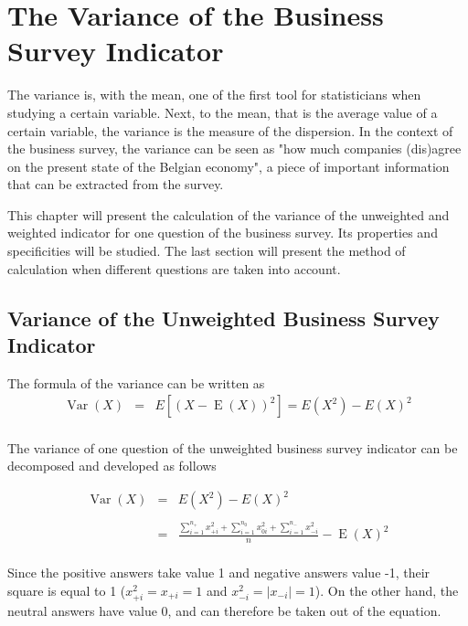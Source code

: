\documentclass[12pt,a4paper,oneside]{book}
\DeclareMathOperator{\Var}{Var}
\DeclareMathOperator{\E}{E}
\begin{document}
\chapter{The Variance of the Business Survey Indicator}

The variance is, with the mean, one of the first tool for statisticians when studying a certain variable. 
Next, to the mean, that is the average value of a certain variable, the variance is the measure of the dispersion. 
In the context of the business survey, the variance can be seen as "how much companies (dis)agree on the present state of the Belgian economy", a piece of important information that can be extracted from the survey.

This chapter will present the calculation of the variance of the unweighted and weighted indicator for one question of the business survey. 
Its properties and specificities will be studied.
The last section will present the method of calculation when different questions are taken into account.

\section{Variance of the Unweighted Business Survey Indicator}

\nocite{alcaniz_calculation_2006}

The formula of the variance can be written as 
\begin{eqnarray}
         \Var(X) &=& E \left[ \left(X-\E(X) \right)^2 \right] =  E\left( X^2\right) - E\left( X\right)^2 \\ \nonumber
\end{eqnarray}

The variance of one question of the unweighted business survey indicator can be decomposed and developed as follows

\begin{eqnarray}
\Var(X) &=&  E\left( X^2\right) - E\left( X\right)^2 \nonumber \\ \nonumber \\
    &=&  \frac{\sum_{i=1}^{n_+} x_{+i}^2  +  \sum_{i=1}^{n_0} x_{0i}^2 + \sum_{i=1}^{n_-} x_{-i}^2}{n}  - \E(X)^2 \\ \nonumber
\end{eqnarray}


Since the positive answers take value 1 and negative answers value -1, their square is equal to 1 ($x_{+i}^2 = x_{+i} = 1$ and $x_{-i}^2 = |x_{-i}| = 1$). 
On the other hand, the neutral answers have value 0, and can therefore be taken out of the equation.
\end{document}
